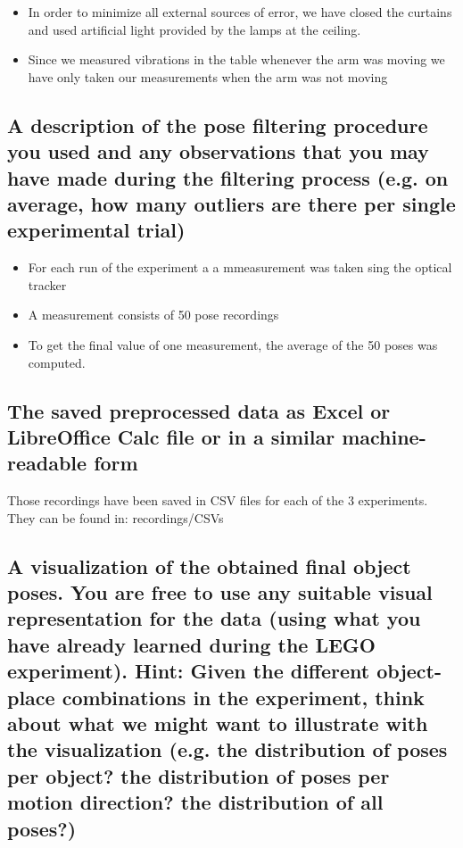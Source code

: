\begin{itemize}
	\item In order to minimize all external sources of error, we have closed the curtains and used artificial light provided by the lamps at the ceiling.
	\item Since we measured vibrations in the table whenever the arm was moving we have only taken our measurements when the arm was not moving
\end{itemize}






\subsection{A description of the pose filtering procedure you used and any observations that you may have made during the filtering process (e.g. on average, how many outliers are there per single experimental trial)}

\begin{itemize}
	\item For each run of the experiment a a mmeasurement was taken sing the optical tracker
	\item A measurement consists of 50 pose recordings
	\item To get the final value of one measurement, the average of the 50 poses was computed.
	
\end{itemize}


\subsection{The saved preprocessed data as Excel or LibreOffice Calc file or in a similar machine-readable form}

Those recordings have been saved in CSV files for each of the 3 experiments. They can be found in: recordings/CSVs

\subsection{A visualization of the obtained final object poses. You are free to use any suitable visual representation for the data (using what you have already learned during the LEGO experiment). Hint: Given the different object-place combinations in the experiment, think about what we might want to illustrate with the visualization (e.g. the distribution of poses per object? the distribution of poses per motion direction? the distribution of all poses?)}


